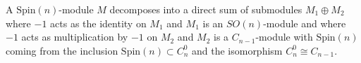 A $\text{Spin}(n)$-module $M$ decomposes into a direct sum of submodules $M_1 \oplus M_2$ where $-1$ acts as the identity on $M_1$ and $M_1$ is an $SO(n)$-module and where $-1$ acts as multiplication by $-1$ on $M_2$ and $M_2$ is a $C_{n-1}$-module with $\text{Spin}(n)$ coming from the inclusion $\text{Spin}(n) \subset C_n^0$ and the isomorphism $C_n^0 \cong C_{n-1}$.
